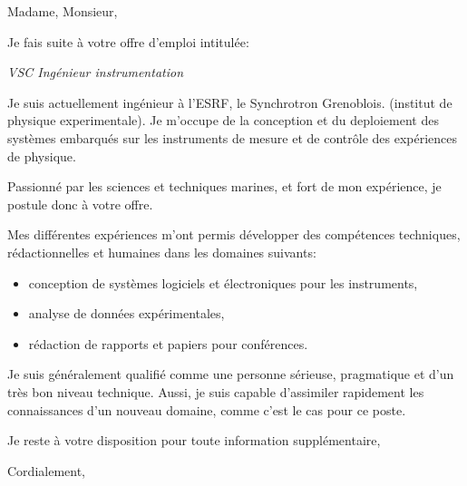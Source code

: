 \documentclass[11pt]{letter} %
\begin{document}
\signature{Le Mentec Fabien}               %
\longindentation=0pt                       %
\let\raggedleft\raggedright                %
 
\begin{letter}{}
\vfill %

\opening{Madame, Monsieur,} 

\noindent
Je fais suite \`{a} votre offre d'emploi intitul\'{e}e:
\begin{center}
  \textit{VSC Ing\'{e}nieur instrumentation}
\end{center}

\noindent
Je suis actuellement ing\'{e}nieur \`{a} l'ESRF, le Synchrotron Grenoblois.
(institut de physique experimentale). Je m'occupe de la conception et du deploiement
des syst\`{e}mes embarqu\'{e}s sur les instruments de mesure et de contr\^{o}le des
exp\'{e}riences de physique.

\noindent
Passionn\'{e} par les sciences et techniques marines, et fort de mon exp\'{e}rience,
je postule donc \`{a} votre offre.

\noindent
Mes diff\'{e}rentes exp\'{e}riences m'ont permis d\'{e}velopper des comp\'{e}tences
techniques, r\'{e}dactionnelles et humaines dans les domaines suivants:
\begin{itemize}
\item conception de syst\`{e}mes logiciels et \'{e}lectroniques pour les instruments,
\item analyse de donn\'{e}es exp\'{e}rimentales,
\item r\'{e}daction de rapports et papiers pour conf\'{e}rences.
\end{itemize}

\noindent
Je suis g\'{e}n\'{e}ralement qualifi\'{e} comme une personne s\'{e}rieuse, pragmatique
et d'un tr\`{e}s bon niveau technique. Aussi, je suis capable d'assimiler rapidement
les connaissances d'un nouveau domaine, comme c'est le cas pour ce poste.

\noindent
Je reste \`{a} votre disposition pour toute information suppl\'{e}mentaire,

\closing{Cordialement,}

 
\end{letter}
 
\end{document}
